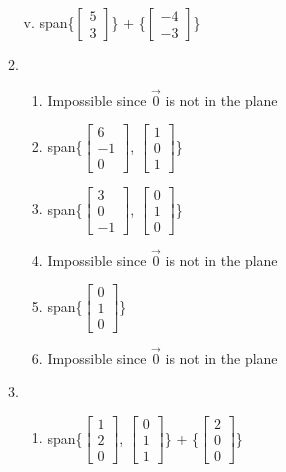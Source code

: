 \documentclass{article}
\begin{document}
\begin{solution}
\begin{enumerate}
\begin{enumerate}
                    v. span\{$\begin{bmatrix}5\\3\end{bmatrix}$\} + \{$\begin{bmatrix}-4\\-3\end{bmatrix}$\}
                \item 
                    \begin{enumerate}
                        \item Impossible since $\Vec{0}$ is not in the plane
                        \item span\{$\begin{bmatrix}6\\-1\\0\end{bmatrix}$, $\begin{bmatrix}1\\0\\1\end{bmatrix}$\}
                        \item span\{$\begin{bmatrix}3\\0\\-1\end{bmatrix}$, $\begin{bmatrix}0\\1\\0\end{bmatrix}$\}
                        \item Impossible since $\Vec{0}$ is not in the plane
                        \item span\{$\begin{bmatrix}0\\1\\0\end{bmatrix}$\}
                        \item Impossible since $\Vec{0}$ is not in the plane
                    \end{enumerate}
                \item 
                    \begin{enumerate}
                        \item span\{$\begin{bmatrix}1\\2\\0\end{bmatrix}$, $\begin{bmatrix}0\\1\\1\end{bmatrix}$\} + \{$\begin{bmatrix}2\\0\\0\end{bmatrix}$\}

\end{enumerate}
\end{enumerate}
\end{enumerate}
\end{solution}
\end{document}
